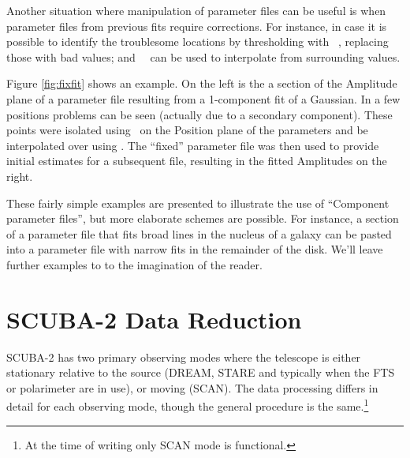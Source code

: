 \documentclass[oneside,11pt]{starlink}
\begin{document}
Another situation where manipulation of parameter files can be useful
is when parameter files from previous fits require corrections. For
instance, in case it is possible to identify the troublesome locations
by thresholding with \KAPPA\ \thresh, replacing those with bad values; and
\KAPPA\ \fillbad\ can be used to interpolate from surrounding values.

Figure \ref{fig:fixfit} shows an example. On the left is the a section
of the Amplitude plane of a parameter file resulting from a
1-component fit of a Gaussian. In a few positions problems can be seen
(actually due to a secondary component).  These points were isolated
using \thresh\ on the Position plane of the parameters and be
interpolated over using \fillbad. The ``fixed'' parameter file was
then used to provide initial estimates for a subsequent file,
resulting in the fitted Amplitudes on the right.

\begin{terminalv}
\end{terminalv}

These fairly simple examples are presented to illustrate the use of
``Component parameter files'', but more elaborate schemes are
possible. For instance, a section of a parameter file that fits broad
lines in the nucleus of a galaxy can be pasted into a parameter file
with narrow fits in the remainder of the disk. We'll leave further
examples to to the imagination of the reader.

\section{SCUBA-2 Data Reduction\label{se:sc2dr}}

SCUBA-2 has two primary observing modes where the telescope is either
stationary relative to the source (DREAM, STARE and typically when the
FTS or polarimeter are in use), or moving (SCAN). The data processing
differs in detail for each observing mode, though the general
procedure is the same.\footnote{At the time of writing only SCAN mode
  is functional.}
\end{document}

